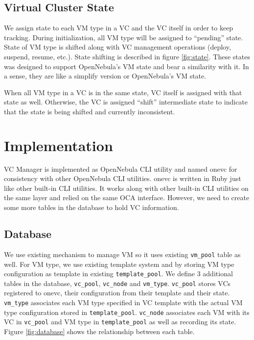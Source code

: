 \documentclass[conference]{IEEEtran}
\begin{document}
\subsection{Virtual Cluster State}
We assign state to each VM type in a VC and the VC itself in order to keep tracking.
During initialization, all VM type will be assigned to ``pending'' state.
State of VM type is shifted along with VC management operations (deploy, suspend, resume, etc.).
State shifting is described in figure \ref{fig:state}.
These states was designed to support OpenNebula's VM state\cite{opennebula-state} and bear a similarity with it.
In a sense, they are like a simplify version or OpenNebula's VM state.

When all VM type in a VC is in the same state, VC itself is assigned with that state as well.
Otherwise, the VC is assigned ``shift'' intermediate state to indicate that the state is being shifted and currently inconsistent.

\section{Implementation}
VC Manager is implemented as OpenNebula CLI utility and named onevc for consistency with other OpenNebula CLI utilities.
onevc is written in Ruby just like other built-in CLI utilities.
It works along with other built-in CLI utilities on the same layer and relied on the same OCA interface.
However, we need to create some more tables in the database to hold VC information.

\subsection{Database}
We use existing mechanism to manage VM so it uses existing \texttt{vm\_pool} table as well.
For VM type, we use existing template system and by storing VM type configuration as template in existing \texttt{template\_pool}.
We define 3 additional tables in the database, \texttt{vc\_pool}, \texttt{vc\_node} and \texttt{vm\_type}.
\texttt{vc\_pool} stores VCs registered to onevc, their configuration from their template and their state.
\texttt{vm\_type} associates each VM type specified in VC template with the actual VM type configuration stored in \texttt{template\_pool}.
\texttt{vc\_node} associates each VM with its VC in \texttt{vc\_pool} and VM type in \texttt{template\_pool} as well as recording its state.
Figure \ref{fig:database} shows the relationship between each table.
\end{document}
